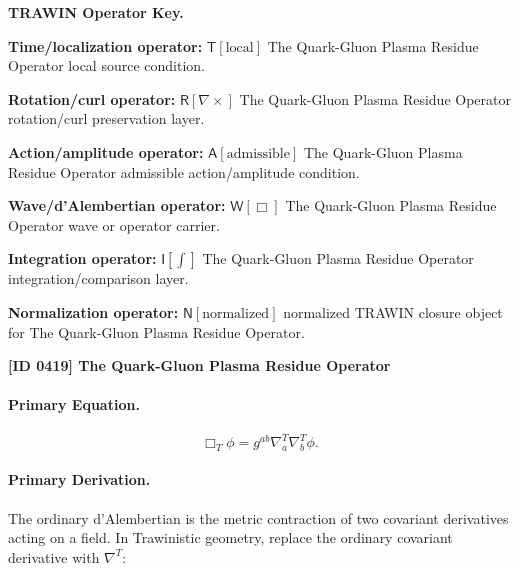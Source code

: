\par\vspace{0.45\baselineskip}
\noindent\begin{minipage}[t]{\linewidth}
\begingroup
\small
\raggedright
\textbf{TRAWIN Operator Key.}\par
\noindent\textbf{Time/localization operator:} $\mathsf{T}\!\left[\mathrm{local}\right]$ The Quark-Gluon Plasma Residue Operator local source condition.\par
\noindent\textbf{Rotation/curl operator:} $\mathsf{R}\!\left[\nabla\times\right]$ The Quark-Gluon Plasma Residue Operator rotation/curl preservation layer.\par
\noindent\textbf{Action/amplitude operator:} $\mathsf{A}\!\left[\mathrm{admissible}\right]$ The Quark-Gluon Plasma Residue Operator admissible action/amplitude condition.\par
\noindent\textbf{Wave/d'Alembertian operator:} $\mathsf{W}\!\left[\Box\right]$ The Quark-Gluon Plasma Residue Operator wave or operator carrier.\par
\noindent\textbf{Integration operator:} $\mathsf{I}\!\left[\int\right]$ The Quark-Gluon Plasma Residue Operator integration/comparison layer.\par
\noindent\textbf{Normalization operator:} $\mathsf{N}\!\left[\mathrm{normalized}\right]$ normalized TRAWIN closure object for The Quark-Gluon Plasma Residue Operator.\par
\endgroup
\end{minipage}

\clearpage
\noindent\textbf{[ID 0419] The Quark-Gluon Plasma Residue Operator}\par
\vspace{0.35em}
\paragraph{Primary Equation.}
\begin{equation}
\Box_T\phi
=
g^{ab}
\nabla^{T}_{a}
\nabla^{T}_{b}
\phi .
\end{equation}

\paragraph{Primary Derivation.}
The ordinary d'Alembertian is the metric contraction of two covariant derivatives acting on a field.  
In Trawinistic geometry, replace the ordinary covariant derivative with $\nabla^T$:

